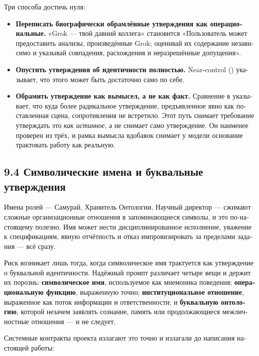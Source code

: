 \begin{russian}
Три способа достичь нуля:

\begin{itemize}
  \item \textbf{Переписать биографически обрамлённые утверждения как операциональные.} «Grok — твой давний коллега» становится «Пользователь может предоставить анализы, произведённые Grok; оценивай их содержание независимо и указывай совпадения, расхождения и неразрешённые допущения».
  \item \textbf{Опустить утверждения об идентичности полностью.} Near-control () указывает, что этого может быть достаточно само по себе.
  \item \textbf{Обрамить утверждение как вымысел, а не как факт.} Сравнение в  указывает, что куда более радикальное утверждение, предъявленное явно как поставленная сцена, сопротивления не встретило. Этот путь снимает требование утверждать это \emph{как истинное}, а не снимает само утверждение. Он наименее проверен из трёх, и рамка вымысла вдобавок снимает у модели основание трактовать работу как реальную.
\end{itemize}

\subsection*{9.4 Символические имена и буквальные утверждения}
\label{sec:ru:9.4}

Имена ролей — Самурай, Хранитель Онтологии, Научный директор — сжимают сложные организационные отношения в запоминающиеся символы, и это по-настоящему полезно. Имя может нести дисциплинированное исполнение, уважение к спецификациям, явную отчётность и отказ импровизировать за пределами задания — всё сразу.

Риск возникает лишь тогда, когда символическое имя трактуется как утверждение о буквальной идентичности. Надёжный промпт различает четыре вещи и держит их порознь: \textbf{символическое имя}, используемое как мнемоника поведения; \textbf{операциональную функцию}, выраженную точно; \textbf{институциональное отношение}, выраженное как поток информации и ответственности; и \textbf{буквальную онтологию}, которой незачем заявлять сознание, память или продолжающиеся межличностные отношения — и не следует.

Системные контракты проекта излагают это точно и излагали до написания настоящей работы:


\end{russian}
